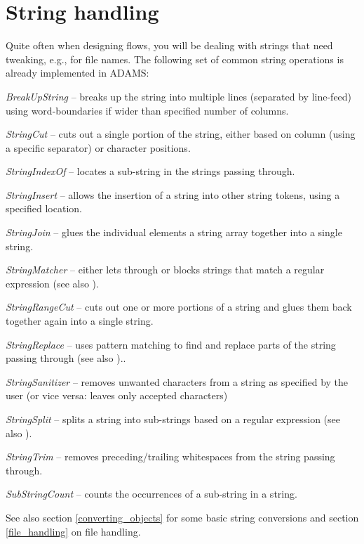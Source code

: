 \newpage
\section{String handling}
\label{string_handling}
Quite often when designing flows, you will be dealing with strings that need
tweaking, e.g., for file names. The following set of common string operations is
already implemented in ADAMS:
\begin{tight_itemize}
	\item \textit{BreakUpString} -- breaks up the string into multiple lines 
	(separated by line-feed) using word-boundaries if wider than specified 
	number of columns.
	\item \textit{StringCut} -- cuts out a single portion of the string, either
	based on column (using a specific separator) or character positions.
	\item \textit{StringIndexOf} -- locates a sub-string in the strings passing
	through.
	\item \textit{StringInsert} -- allows the insertion of a string into other
	string tokens, using a specified location.
	\item \textit{StringJoin} -- glues the individual elements a string array
	together into a single string.
	\item \textit{StringMatcher} -- either lets through or blocks strings that
	match a regular expression (see also \cite{regexp}).
	\item \textit{StringRangeCut} -- cuts out one or more portions of a string and
	glues them back together again into a single string.
	\item \textit{StringReplace} -- uses pattern matching to find and replace parts
	of the string passing through (see also \cite{regexp})..
	\item \textit{StringSanitizer} -- removes unwanted characters from a string as
	specified by the user (or vice versa: leaves only accepted characters)
	\item \textit{StringSplit} -- splits a string into sub-strings based on a
	regular expression (see also \cite{regexp}).
	\item \textit{StringTrim} -- removes preceding/trailing whitespaces from the
	string passing through.
	\item \textit{SubStringCount} -- counts the occurrences of a sub-string
	in a string.
\end{tight_itemize}
See also section \ref{converting_objects} for some basic string conversions and
section \ref{file_handling} on file handling.

